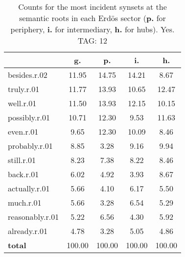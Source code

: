 \begin{table}[h!]
\begin{center}
\begin{tabular}{| l | c | c | c | c |}\hline
 & g. & p. & i. & h. \\\hline
besides.r.02 & 11.95  & 14.75  & 14.21  & 8.67 \\\hline
truly.r.01 & 11.77  & 13.93  & 10.65  & 12.47 \\\hline
well.r.01 & 11.50  & 13.93  & 12.15  & 10.15 \\\hline
possibly.r.01 & 10.71  & 12.30  & 9.53  & 11.63 \\\hline
even.r.01 & 9.65  & 12.30  & 10.09  & 8.46 \\\hline
probably.r.01 & 8.85  & 3.28  & 9.16  & 9.94 \\\hline
still.r.01 & 8.23  & 7.38  & 8.22  & 8.46 \\\hline
back.r.01 & 6.02  & 4.92  & 3.93  & 8.67 \\\hline
actually.r.01 & 5.66  & 4.10  & 6.17  & 5.50 \\\hline
much.r.01 & 5.66  & 3.28  & 6.54  & 5.29 \\\hline
reasonably.r.01 & 5.22  & 6.56  & 4.30  & 5.92 \\\hline
already.r.01 & 4.78  & 3.28  & 5.05  & 4.86 \\\hline
{{\bf total}} & 100.00  & 100.00  & 100.00  & 100.00 \\\hline
\end{tabular}
\caption{Counts for the most incident synsets at the semantic roots in each Erd\"os sector ({\bf p.} for periphery, {\bf i.} for intermediary, {\bf h.} for hubs). Yes. TAG: 12}
\end{center}
\end{table}